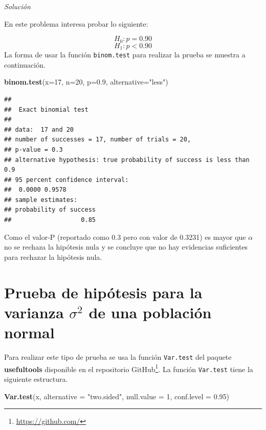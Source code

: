 \documentclass[10pt,]{krantz}
\makeatletter
\newenvironment{Shaded}{\begin{snugshade}}{\end{snugshade}}
\newcommand{\KeywordTok}[1]{\textcolor[rgb]{0.13,0.29,0.53}{\textbf{#1}}}
\newcommand{\DataTypeTok}[1]{\textcolor[rgb]{0.13,0.29,0.53}{#1}}
\newcommand{\DecValTok}[1]{\textcolor[rgb]{0.00,0.00,0.81}{#1}}
\newcommand{\FloatTok}[1]{\textcolor[rgb]{0.00,0.00,0.81}{#1}}
\newcommand{\StringTok}[1]{\textcolor[rgb]{0.31,0.60,0.02}{#1}}
\newcommand{\NormalTok}[1]{#1}
\renewcommand{\href}[2]{#2\footnote{\url{#1}}}
\newenvironment{kframe}{%
\medskip{}
\setlength{\fboxsep}{.8em}
 \def\at@end@of@kframe{}%
 \ifinner\ifhmode%
  \def\at@end@of@kframe{\end{minipage}}%
  \begin{minipage}{\columnwidth}%
 \fi\fi%
 \def\FrameCommand##1{\hskip\@totalleftmargin \hskip-\fboxsep
 \colorbox{shadecolor}{##1}\hskip-\fboxsep
     \hskip-\linewidth \hskip-\@totalleftmargin \hskip\columnwidth}%
 \MakeFramed {\advance\hsize-\width
   \@totalleftmargin\z@ \linewidth\hsize
   \@setminipage}}%
 {\par\unskip\endMakeFramed%
 \at@end@of@kframe}
\renewenvironment{Shaded}{\begin{kframe}}{\end{kframe}}
\makeatother
\begin{document}
\emph{Solución}

En este problema interesa probar lo siguiente:

\[H_0: p = 0.90\] \[H_1: p < 0.90\] La forma de usar la función
\texttt{binom.test} para realizar la prueba se muestra a continuación.

\begin{Shaded}
\begin{Highlighting}[]
\KeywordTok{binom.test}\NormalTok{(}\DataTypeTok{x=}\DecValTok{17}\NormalTok{, }\DataTypeTok{n=}\DecValTok{20}\NormalTok{, }\DataTypeTok{p=}\FloatTok{0.9}\NormalTok{, }\DataTypeTok{alternative=}\StringTok{"less"}\NormalTok{)}
\end{Highlighting}
\end{Shaded}

\begin{verbatim}
## 
##  Exact binomial test
## 
## data:  17 and 20
## number of successes = 17, number of trials = 20,
## p-value = 0.3
## alternative hypothesis: true probability of success is less than 0.9
## 95 percent confidence interval:
##  0.0000 0.9578
## sample estimates:
## probability of success 
##                   0.85
\end{verbatim}

Como el valor-P (reportado como 0.3 pero con valor de 0.3231) es mayor
que \(\alpha\) no se rechaza la hipótesis nula y se concluye que no hay
evidencias suficientes para rechazar la hipótesis nula.

\section{\texorpdfstring{Prueba de hipótesis para la varianza
\(\sigma^2\) de una población
normal}{Prueba de hipótesis para la varianza \textbackslash{}sigma\^{}2 de una población normal}}\label{prueba-de-hipotesis-para-la-varianza-sigma2-de-una-poblacion-normal}

Para realizar este tipo de prueba se usa la función \texttt{Var.test}
del paquete \textbf{usefultools} \citep{R-usefultools} disponible en el
repositorio \href{https://github.com/}{GitHub}. La función
\texttt{Var.test} tiene la siguiente estructura.

\begin{Shaded}
\begin{Highlighting}[]
\KeywordTok{Var.test}\NormalTok{(x, }\DataTypeTok{alternative =} \StringTok{"two.sided"}\NormalTok{,}
         \DataTypeTok{null.value =} \DecValTok{1}\NormalTok{, }\DataTypeTok{conf.level =} \FloatTok{0.95}\NormalTok{)}
\end{Highlighting}
\end{Shaded}
\end{document}
